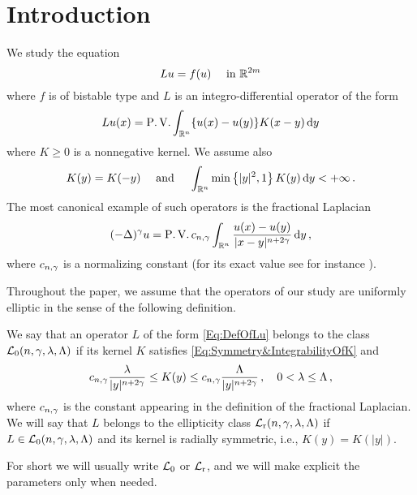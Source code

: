 \section{Introduction}
\label{Sec:Introduction}


We study the equation
\begin{equation}
\label{Eq:NonlocalAllenCahn}
Lu = f(u) \quad \textrm{ in } \mathbb{R}^{2m}
\end{equation}
where $f$ is of bistable type and $L$ is an integro-differential operator of the form
\begin{equation}
\label{Eq:DefOfLu}
Lu(x) = \operatorname{P.V.} \int_{\mathbb{R}^n} \{u(x) - u(y)\} K(x-y)\,\mathrm{d} y
\end{equation}
where $K \geq 0$ is a nonnegative kernel. We assume also
\begin{equation}
\label{Eq:Symmetry&IntegrabilityOfK}
K(y) = K(-y) \quad \textrm{ and } \quad \int_{\mathbb{R}^n} \min \left\{ |y|^2, 1 \right\} K(y) \,\mathrm{d} y < + \infty\,.
\end{equation}
The most canonical example of such operators is the fractional Laplacian
$$
(-\Delta)^\gamma u = \operatorname{P.V.} c_{n, \gamma}\int_{\mathbb{R}^n} \dfrac{u(x) - u(y)}{|x-y|^{n + 2\gamma}}\,\mathrm{d} y\,,
$$
where $c_{n, \gamma}$ is a normalizing constant (for its exact value see for instance \cite{HitchhikerGuide}).

Throughout the paper, we assume that the operators of our study are uniformly elliptic in the sense of the following definition.
\begin{definition}
\label{Def:L_0Class}
We say that an operator $L$ of the form \eqref{Eq:DefOfLu} belongs to the class $\mathcal{L}_0(n,\gamma,\lambda, \Lambda)$ if its kernel $K$ satisfies \eqref{Eq:Symmetry&IntegrabilityOfK} and \begin{equation}
\label{Eq:Ellipticity}
c_{n,\gamma}\dfrac{\lambda}{|y|^{n+2\gamma}} \leq K(y) \leq c_{n,\gamma}\dfrac{\Lambda}{|y|^{n+2\gamma}}\,, \quad 0< \lambda \leq \Lambda \,,
\end{equation}
where $c_{n,\gamma}$ is the constant appearing in the definition of the fractional Laplacian. We will say that $L$ belongs to the ellipticity class $\mathcal{L}_{\mathrm{r}}(n,\gamma,\lambda, \Lambda)$ if $L\in \mathcal{L}_0(n,\gamma,\lambda, \Lambda)$ and its kernel is radially symmetric, i.e., $K(y)=K(|y|)$.
\end{definition}
For short we will usually write $\mathcal{L}_0$ or $\mathcal{L}_{\mathrm{r}}$, and we will make explicit the parameters only when needed.



